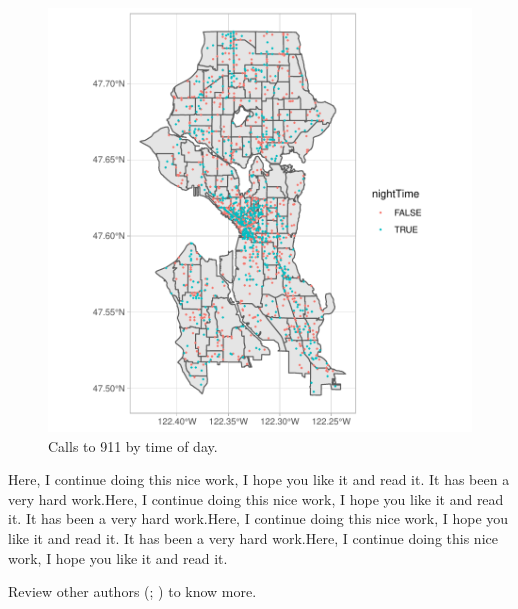 \documentclass[11pt]{article}
\begin{document}
\begin{figure}[h]
\centering
\begin{adjustbox}{width=10cm,height=10cm} 
\includegraphics{WorkInR_forPrinter-timeMap_plot}
\end{adjustbox}
\caption{Calls to 911 by time of day.}  
\label{timeMap_plot} 
\end{figure}


Here, I continue doing this nice work, I hope you like it and read it. It has been a very hard work.Here, I continue doing this nice work, I hope you like it and read it. It has been a very hard work.Here, I continue doing this nice work, I hope you like it and read it. It has been a very hard work.Here, I continue doing this nice work, I hope you like it and read it. 

Review other authors (\citealp[120-160]{brunsdon_introduction_2015}; \citealp[also, see][]{camara_spatial_nodate}) to know more.







\newpage


%

\end{document}
